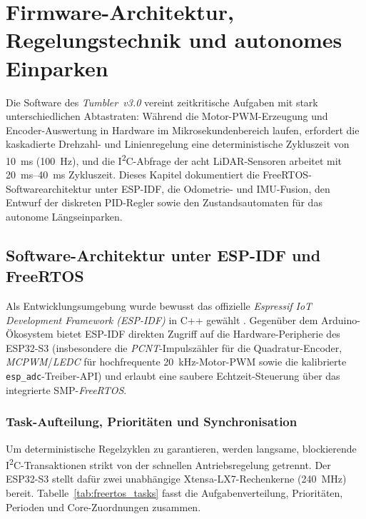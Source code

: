 \chapter{Firmware-Architektur, Regelungstechnik und autonomes Einparken}
\label{chap:software}

Die Software des \emph{Tumbler~v3.0} vereint zeitkritische Aufgaben mit stark unterschiedlichen Abtastraten: Während die Motor-PWM-Erzeugung und Encoder-Auswertung in Hardware im Mikrosekundenbereich laufen, erfordert die kaskadierte Drehzahl- und Linienregelung eine deterministische Zykluszeit von \qty{10}{\milli\second} (\qty{100}{\hertz}), und die I\textsuperscript{2}C-Abfrage der acht LiDAR-Sensoren arbeitet mit \qtyrange{20}{40}{\milli\second} Zykluszeit. Dieses Kapitel dokumentiert die FreeRTOS-Softwarearchitektur unter ESP-IDF, die Odometrie- und IMU-Fusion, den Entwurf der diskreten PID-Regler sowie den Zustandsautomaten für das autonome Längseinparken.

\section{Software-Architektur unter ESP-IDF und FreeRTOS}
\label{sec:freertos_arch}
Als Entwicklungsumgebung wurde bewusst das offizielle \emph{Espressif IoT Development Framework (ESP-IDF)} in C++ gewählt \cite{EspressifESPIDF}. Gegenüber dem Arduino-Ökosystem bietet ESP-IDF direkten Zugriff auf die Hardware-Peripherie des ESP32-S3 (insbesondere die \emph{PCNT}-Impulszähler für die Quadratur-Encoder, \emph{MCPWM}/\emph{LEDC} für hochfrequente \qty{20}{\kilo\hertz}-Motor-PWM sowie die kalibrierte \texttt{esp\_adc}-Treiber-API) und erlaubt eine saubere Echtzeit-Steuerung über das integrierte SMP-\emph{FreeRTOS}.

\subsection{Task-Aufteilung, Prioritäten und Synchronisation}
Um deterministische Regelzyklen zu garantieren, werden langsame, blockierende I\textsuperscript{2}C-Transaktionen strikt von der schnellen Antriebsregelung getrennt. Der ESP32-S3 stellt dafür zwei unabhängige Xtensa-LX7-Rechenkerne (\qty{240}{\mega\hertz}) bereit. Tabelle~\ref{tab:freertos_tasks} fasst die Aufgabenverteilung, Prioritäten, Perioden und Core-Zuordnungen zusammen.

